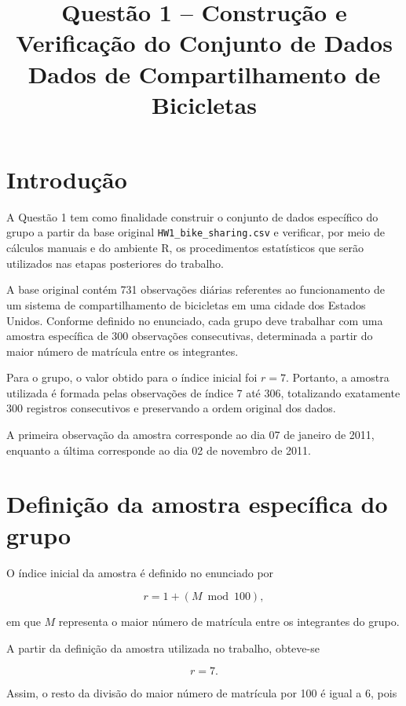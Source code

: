 \documentclass[12pt,a4paper]{article}
\title{\textbf{Questão 1 -- Construção e Verificação do Conjunto de Dados\\
Dados de Compartilhamento de Bicicletas}}
\author{}
\date{}
\begin{document}
\maketitle

\section{Introdução}

A Questão 1 tem como finalidade construir o conjunto de dados específico do grupo
a partir da base original \texttt{HW1\_bike\_sharing.csv} e verificar,
por meio de cálculos manuais e do ambiente R, os procedimentos estatísticos que
serão utilizados nas etapas posteriores do trabalho.

A base original contém 731 observações diárias referentes ao funcionamento de
um sistema de compartilhamento de bicicletas em uma cidade dos Estados Unidos.
Conforme definido no enunciado, cada grupo deve trabalhar com uma amostra
específica de 300 observações consecutivas, determinada a partir do maior número
de matrícula entre os integrantes.

Para o grupo, o valor obtido para o índice inicial foi $r=7$. Portanto, a
amostra utilizada é formada pelas observações de índice 7 até 306, totalizando
exatamente 300 registros consecutivos e preservando a ordem original dos dados.

A primeira observação da amostra corresponde ao dia 07 de janeiro de 2011,
enquanto a última corresponde ao dia 02 de novembro de 2011.

\section{Definição da amostra específica do grupo}

O índice inicial da amostra é definido no enunciado por

\begin{equation}
r = 1 + (M \bmod 100),
\end{equation}

em que $M$ representa o maior número de matrícula entre os integrantes do grupo.

A partir da definição da amostra utilizada no trabalho, obteve-se

\begin{equation}
r = 7.
\end{equation}

Assim, o resto da divisão do maior número de matrícula por 100 é igual a 6,
pois
\end{document}
